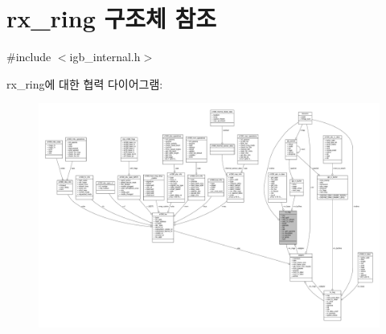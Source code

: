 \hypertarget{structrx__ring}{}\section{rx\+\_\+ring 구조체 참조}
\label{structrx__ring}


{\ttfamily \#include $<$igb\+\_\+internal.\+h$>$}



rx\+\_\+ring에 대한 협력 다이어그램\+:
\nopagebreak
\begin{figure}[H]
\begin{center}
\leavevmode
\includegraphics[width=350pt]{structrx__ring__coll__graph}
\end{center}
\end{figure}
